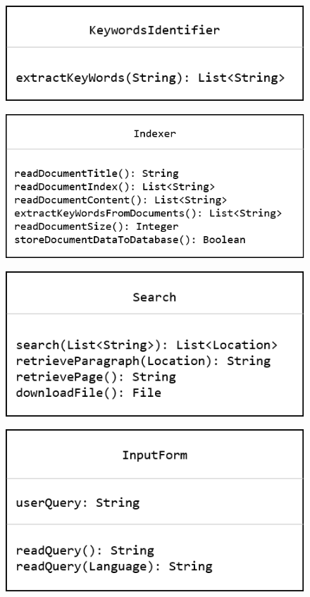 \documentclass[11pt,letterpaper]{article}
\begin{document}
\begin{figure}[H]
\includegraphics{class_keyword_identifier}
\centering
\end{figure}

\begin{figure}[H]
\includegraphics{class_indexer}
\centering
\end{figure}

\begin{figure}[H]
\includegraphics{class_search}
\centering
\end{figure}

\begin{figure}[H]
\includegraphics{class_input_form}
\centering
\end{figure}
\end{document}
